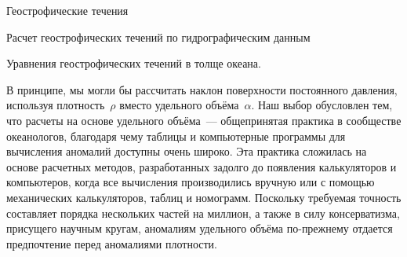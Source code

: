\begin{chapter}{Геострофические течения}
\begin{section}{Расчет геострофических течений по гидрографическим данным}
\begin{paragraph}{Уравнения геострофических течений в толще океана.}

В принципе, мы могли бы рассчитать наклон поверхности постоянного
давления, используя плотность~$\rho$ вместо удельного объёма~$\alpha$. 
Наш выбор обусловлен тем, что расчеты на основе удельного объёма~--- 
общепринятая практика в сообществе океанологов, благодаря чему таблицы 
и компьютерные программы для вычисления аномалий доступны очень широко. 
Эта практика сложилась на основе расчетных методов, разработанных задолго 
до появления калькуляторов и компьютеров, когда все вычисления производились
вручную или с помощью механических калькуляторов, таблиц и номограмм.
Поскольку требуемая точность составляет порядка
нескольких частей на миллион, а также в силу консерватизма, присущего научным
кругам, аномалиям удельного объёма по-прежнему отдается предпочтение перед 
аномалиями плотности.
%
\end{paragraph}


\end{section}
\end{chapter}
